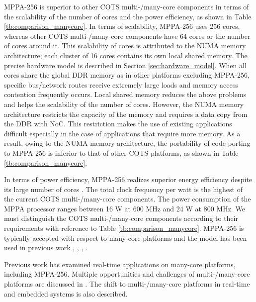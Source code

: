MPPA-256 is superior to other COTS multi-/many-core components in terms of the scalability of the number of cores and the power efficiency, as shown in Table \ref{tb:comparison_manycore}.
In terms of scalability, MPPA-256 uses 256 cores, whereas other COTS multi-/many-core components have 64 cores or the number of cores around it.
This scalability of cores is attributed to the NUMA memory architecture; each cluster of 16 cores contains its own local shared memory.
The precise hardware model is described in Section \ref{sec:hardware_model}.
When all cores share the global DDR memory as in other platforms excluding MPPA-256, specific bus/network routes receive extremely large loads and memory access contention frequently occurs.
Local shared memory reduces the above problems and helps the scalability of the number of cores.
However, the NUMA memory architecture restricts the capacity of the memory and requires a data copy from the DDR with NoC.
This restriction makes the use of existing applications difficult especially in the case of applications that require more memory.
As a result, owing to the NUMA memory architecture, the portability of code porting to MPPA-256 is inferior to that of other COTS platforms, as shown in Table \ref{tb:comparison_manycore}.

In terms of power efficiency, MPPA-256 realizes superior energy efficiency despite its large number of cores \cite{kanter2015kalray}.
The total clock frequency per watt is the highest of the current COTS multi-/many-core components.
The power consumption of the MPPA processor ranges between 16 W at 600 MHz and 24 W at 800 MHz.
We must distinguish the COTS multi-/many-core components according to their requirements with reference to Table \ref{tb:comparison_manycore}.
MPPA-256 is typically accepted with respect to many-core platforms and the model has been used in previous work \cite{becker2016contention}, \cite{carle2014static}, \cite{perret2016mapping}, \cite{perret2016predictable}.

Previous work has examined real-time applications on many-core platforms, including MPPA-256.
Multiple opportunities and challenges of multi-/many-core platforms are discussed in \cite{saidi2015shift}.
The shift to multi-/many-core platforms in real-time and embedded systems is also described. 

